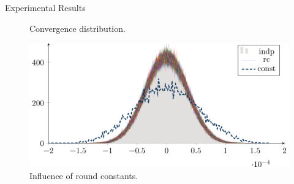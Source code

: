 \begin{columns}[t]
\begin{column}{\twocolwid}
\begin{block}{Experimental Results}
\begin{minipage}{0.245\textwidth}
\begin{figure}[ht!]
			\caption{Convergence distribution.}\label{fig:convergence}
		\end{figure}
	\end{minipage}
	\begin{minipage}{0.245\textwidth}
		\begin{figure}[ht!]
			\includegraphics[keepaspectratio,width=\textwidth]{figures/distribution_rc/plot.png}
			\caption{Influence of round constants.}\label{fig:rc}
		\end{figure}
	\end{minipage}
\end{block}

\end{column}
\end{columns}


